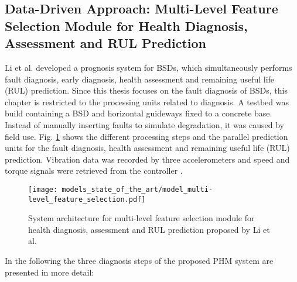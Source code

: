 \subsection{Data-Driven Approach: Multi-Level Feature Selection Module for Health Diagnosis, Assessment and RUL Prediction}
Li et al. \cite{LiPin2018} developed a prognosis system for BSDs, which simultaneously performs fault diagnosis, early diagnosis, health assessment and remaining useful life (RUL) prediction. Since this thesis focuses on the fault diagnosis of BSDs, this chapter is restricted to the processing units related to diagnosis. A testbed was build containing a BSD and horizontal guideways fixed to a concrete base. Instead of manually inserting faults to simulate degradation, it was caused by field use. Fig.  \ref{fig:level_feature_selection_model} shows the different processing steps and the parallel prediction units for the fault diagnosis, health assessment and remaining useful life (RUL) prediction. Vibration data was recorded by three accelerometers and speed and torque signals were retrieved from the controller \cite{LiPin2018}. 

\begin{figure}[H]
  \centering
  \texttt{[image: models\_state\_of\_the\_art/model\_multi-level\_feature\_selection.pdf]}
  \caption{System architecture for multi-level feature selection module for health diagnosis, assessment and RUL prediction proposed by Li et al. \cite{LiPin2018}}
  \label{fig:level_feature_selection_model}
\end{figure}

In the following the three diagnosis steps of the proposed PHM system are presented in more detail:


